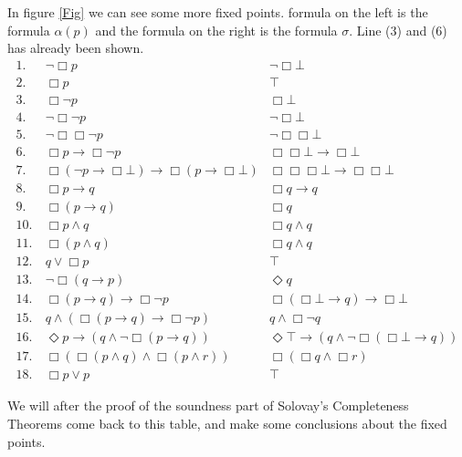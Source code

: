 \documentclass[../main.tex]{subfiles}
\begin{document}
In figure \ref{Fig} we can see some more fixed points. 
formula on the left is the formula $\alpha(p)$ and the formula on the right is
the formula $\sigma$. Line (3) and (6) has already been shown.
\newpage
\begin{align*}
	1. &\ \neg\Box p & \neg\Box\bot\\
	2. &\ \Box p & \top\\
	3. &\ \Box\neg p & \Box\bot\\
	4. &\ \neg\Box\neg p & \neg\Box\bot\\
	5. &\ \neg\Box\Box\neg p & \neg\Box\Box\bot\\
	6. &\ \Box p \rightarrow\Box\neg p & \Box\Box\bot\rightarrow\Box\bot\\
	7. &\ \Box (\neg
	p\rightarrow\Box\bot)\rightarrow\Box(p\rightarrow\Box\bot) &
	\Box\Box\Box\bot\rightarrow\Box\Box\bot\\
	8. &\ \Box p\rightarrow q & \Box q\rightarrow q\\
	9. &\ \Box(p\rightarrow q) & \Box q\\
	10. &\ \Box p\wedge q & \Box q\wedge q\\
	11. &\ \Box(p\wedge q) & \Box q\wedge q\\
	12. &\ q\vee \Box p & \top\\	
	13. &\ \neg\Box(q\rightarrow p) & \Diamond q\\
	14. &\ \Box(p\rightarrow q)\rightarrow\Box\neg p &
	\Box(\Box\bot\rightarrow q)\rightarrow\Box\bot\\
	15. &\ q\wedge(\Box(p\rightarrow q)\rightarrow\Box\neg p) &
	q\wedge\Box\neg q\\
	16. &\ \Diamond p\rightarrow(q\wedge\neg\Box(p\rightarrow q)) &
	\Diamond\top \rightarrow (q\wedge\neg\Box(\Box\bot\rightarrow q))\\
	17. &\ \Box(\Box(p\wedge q)\wedge\Box(p\wedge r)) & \Box(\Box q \wedge
	\Box r)\\
	18. &\ \Box p\vee p & \top
\end{align*}
\begingroup\vspace*{-\baselineskip}
\label{Fig}
\vspace*{\baselineskip}\endgroup

We will after the proof of the soundness part of  Solovay's Completeness Theorems come back to this
table, and make some conclusions about the fixed points.
\end{document}
